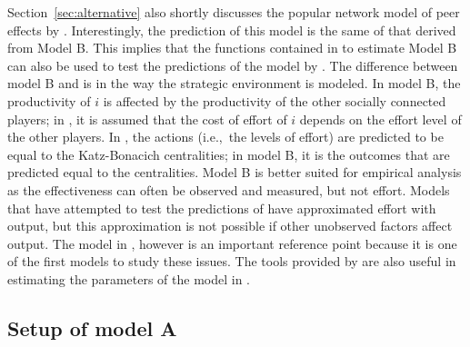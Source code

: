 \documentclass[nojss]{jss}
\begin{document}
Section~\ref{sec:alternative} also shortly discusses the popular network
model of peer effects by \cite{Ballester+Armengol+Zenou:2006}. 
Interestingly, the prediction of this model is the same of that derived from
Model B.  This implies that the functions contained in  to
estimate Model B can also be used to test the predictions of the model by
\cite{Ballester+Armengol+Zenou:2006}.  The difference between model B and
\cite{Ballester+Armengol+Zenou:2006} is in the way the strategic environment
is modeled.  In model B, the productivity of $i$ is affected by the
productivity of the other socially connected players; in
\cite{Ballester+Armengol+Zenou:2006}, it is assumed that the cost of effort
of $i$ depends on the effort level of the other players.  In
\cite{Ballester+Armengol+Zenou:2006}, the actions (i.e.,~the levels of
effort) are predicted to be equal to the Katz-Bonacich centralities; in
model B, it is the outcomes that are predicted equal to the centralities. 
Model B is better suited for empirical analysis as the effectiveness can
often be observed and measured, but not effort.  Models that have attempted
to test the predictions of \cite{Ballester+Armengol+Zenou:2006} have
approximated effort with output, but this approximation is not possible if
other unobserved factors affect output.  The model in
\cite{Ballester+Armengol+Zenou:2006}, however is an important reference
point because it is one of the first models to study these issues. The tools
provided by  are also useful in estimating the parameters of the
model in \cite{Ballester+Armengol+Zenou:2006}.

\subsection{Setup of model A}\label{sec:modelA}
\end{document}
